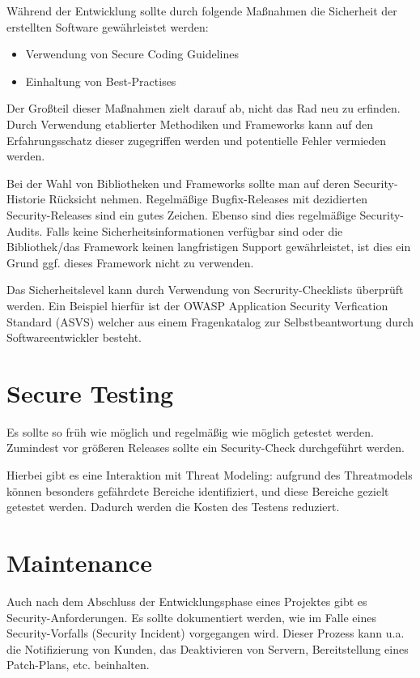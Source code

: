 Während der Entwicklung sollte durch folgende Maßnahmen die Sicherheit der erstellten Software gewährleistet werden: 

\begin{itemize}
	\item Verwendung von Secure Coding Guidelines
	\item Einhaltung von Best-Practises
\end{itemize}

Der Großteil dieser Maßnahmen zielt darauf ab, nicht das Rad neu zu erfinden. Durch Verwendung etablierter Methodiken und Frameworks kann auf den Erfahrungsschatz dieser zugegriffen werden und potentielle Fehler vermieden werden.

Bei der Wahl von Bibliotheken und Frameworks sollte man auf deren Security-Historie Rücksicht nehmen. Regelmäßige Bugfix-Releases mit dezidierten Security-Releases sind ein gutes Zeichen. Ebenso sind dies regelmäßige Security-Audits. Falls keine Sicherheitsinformationen verfügbar sind oder die Bibliothek/das Framework keinen langfristigen Support gewährleistet, ist dies ein Grund ggf. dieses Framework nicht zu verwenden.

Das Sicherheitslevel kann durch Verwendung von Secrurity-Checklists überprüft werden. Ein Beispiel hierfür ist der OWASP Application Security Verfication Standard (ASVS) welcher aus einem Fragenkatalog zur Selbstbeantwortung durch Softwareentwickler besteht.

\section{Secure Testing}

Es sollte so früh wie möglich und regelmäßig wie möglich getestet werden. Zumindest vor größeren Releases sollte ein Security-Check durchgeführt werden.

Hierbei gibt es eine Interaktion mit Threat Modeling: aufgrund des Threatmodels können besonders gefährdete Bereiche identifiziert, und diese Bereiche gezielt getestet werden. Dadurch werden die Kosten des Testens reduziert.

\section{Maintenance}

Auch nach dem Abschluss der Entwicklungsphase eines Projektes gibt es Security-Anforderungen. Es sollte dokumentiert werden, wie im Falle eines Security-Vorfalls (Security Incident) vorgegangen wird. Dieser Prozess kann u.a. die Notifizierung von Kunden, das Deaktivieren von Servern, Bereitstellung eines Patch-Plans, etc. beinhalten.


